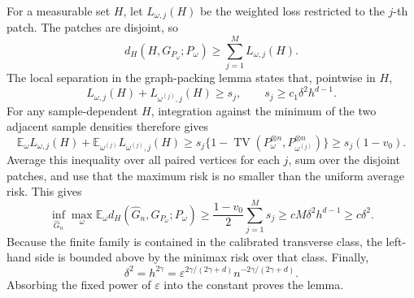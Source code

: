 For a measurable set \(H\), let \(L_{\omega,j}(H)\) be the weighted loss restricted to the \(j\)-th patch. The patches are disjoint, so
\[
 d_H(H,G_{P_\omega};P_\omega)\ge\sum_{j=1}^M L_{\omega,j}(H).
\]
The local separation in the graph-packing lemma states that, pointwise in \(H\),
\[
 L_{\omega,j}(H)+L_{\omega^{(j)},j}(H)
 \ge s_j,
 \qquad
 s_j\ge c_1\delta^2h^{d-1}.
\]
For any sample-dependent \(H\), integration against the minimum of the two adjacent sample densities therefore gives
\[
 \mathbb E_\omega L_{\omega,j}(H)
 +\mathbb E_{\omega^{(j)}}L_{\omega^{(j)},j}(H)
 \ge s_j\{1-\operatorname{TV}(P_\omega^{\otimes n},P_{\omega^{(j)}}^{\otimes n})\}
 \ge s_j(1-v_0).
\]
Average this inequality over all paired vertices for each \(j\), sum over the disjoint patches, and use that the maximum risk is no smaller than the uniform average risk. This gives
\[
 \inf_{\widehat G_n}\max_\omega
 \mathbb E_\omega d_H(\widehat G_n,G_{P_\omega};P_\omega)
 \ge \frac{1-v_0}{2}\sum_{j=1}^M s_j
 \ge cM\delta^2h^{d-1}
 \ge c\delta^2.
\]
Because the finite family is contained in the calibrated transverse class, the left-hand side is bounded above by the minimax risk over that class. Finally,
\[
 \delta^2=h^{2\gamma}
 =\varepsilon^{2\gamma/(2\gamma+d)}n^{-2\gamma/(2\gamma+d)}.
\]
Absorbing the fixed power of \(\varepsilon\) into the constant proves the lemma.
